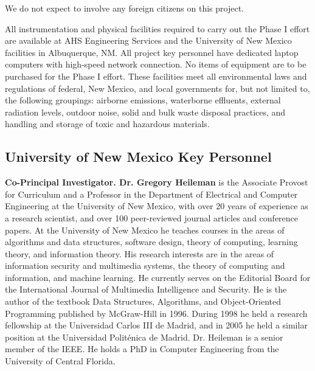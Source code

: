 \documentclass{sbir}
\begin{document}
{
We do not expect to involve any foreign citizens on this project.

 {}
All instrumentation and physical facilities required to carry out the Phase I effort are available at AHS Engineering Services and the University of New Mexico facilities in Albuquerque, NM. All project key personnel have dedicated laptop computers with high-speed network connection. No items of equipment are to be purchased for the Phase I effort. These facilities meet all environmental laws and regulations of federal, New Mexico, and local governments for, but not limited to, the following groupings: airborne emissions, waterborne effluents, external radiation levels, outdoor noise, solid and bulk waste disposal practices, and handling and storage of toxic and hazardous materials.

\label{subs}

\subsection{University of New Mexico Key Personnel}\label{AHS}

{\bf Co-Principal Investigator. Dr. Gregory Heileman } is the Associate Provost for Curriculum and a Professor in the Department of Electrical and Computer Engineering at the University of New Mexico, with over 20 years of experience as a research scientist, and over 100 peer-reviewed journal articles and conference papers. At the University of New Mexico he teaches courses in the areas of algorithms and data structures, software design, theory of computing, learning theory, and information theory. His research interests are in the areas of information security and multimedia systems, the theory of computing and information, and machine learning. He currently serves on the Editorial Board for the International Journal of Multimedia Intelligence and Security. He is the author of the textbook Data Structures, Algorithms, and Object-Oriented Programming published by McGraw-Hill in 1996. During 1998 he held a research fellowship at the Universidad Carlos III de Madrid, and in 2005 he held a similar position at the Universidad Polit\'enica de Madrid. Dr. Heileman is a senior member of the IEEE. He holds a PhD in Computer Engineering from the University of Central Florida.

}
\end{document}
